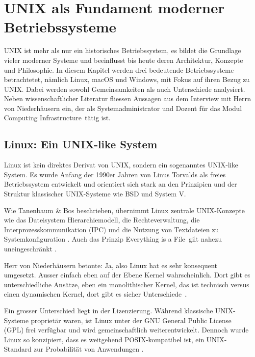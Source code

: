 \section{UNIX als Fundament moderner Betriebssysteme}

UNIX ist mehr als nur ein historisches Betriebssystem, es bildet die Grundlage vieler moderner Systeme und beeinflusst bis heute deren Architektur, Konzepte und
Philosophie. In diesem Kapitel werden drei bedeutende Betriebssysteme betrachtetet, nämlich Linux, macOS und Windows, mit Fokus auf ihren Bezug zu UNIX.
Dabei werden sowohl Gemeinsamkeiten als auch Unterschiede analysiert. Neben wissenschaftlicher Literatur fliessen Aussagen aus dem Interview mit Herrn
von Niederhäusern ein, der als Systemadministrator und Dozent für das Modul \glqq Computing Infrastructure\grqq \ tätig ist.


\subsection{Linux: Ein UNIX-like System}

Linux ist kein direktes Derivat von UNIX, sondern ein sogenanntes UNIX-like System. Es wurde Anfang der 1990er Jahren von Linus Torvalds als freies Betriebssystem
entwickelt und orientiert sich stark an den Prinzipien und der Struktur klassischer UNIX-Systeme wie BSD und System V. \cite{ModernOS}

Wie Tanenbaum \& Bos beschrieben, übernimmt Linux zentrale UNIX-Konzepte wie das Dateisystem Hierarchiemodell, die Rechteverwaltung, die Interprozesskommunikation
(IPC) und die Nutzung von Textdateien zu Systemkonfiguration \cite{ModernOS}. Auch das Prinzip \glqq Everything is a File\grqq \ gilt nahezu uneingeschränkt
\cite{ArtOfUnixProgramming}.

Herr von Niederhäusern betonte: \glqq Ja, also Linux hat es sehr konsequent umgesetzt. Ausser einfach eben auf der Ebene Kernel wahrscheinlich. Dort gibt es
unterschiedliche Ansätze, eben ein monolithischer Kernel, das ist technisch versus einen dynamischen Kernel, dort gibt es sicher Unterschiede\grqq \
\cite{interviewNH}.

Ein grosser Unterschied liegt in der Lizenzierung. Während klassische UNIX-Systeme proprietär waren, ist Linux unter der GNU General Public License (GPL)
frei verfügbar und wird gemeinschaftlich weiterentwickelt. Dennoch wurde Linux so konzipiert, dass es weitgehend POSIX-kompatibel ist, ein UNIX-Standard zur
Probabilität von Anwendungen \cite{OSConcept}.


